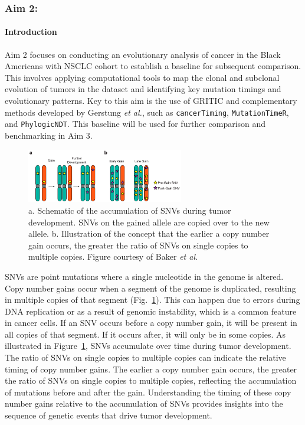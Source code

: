 \subsubsection{Aim 2: \SpecificAimTwo}

\paragraph{Introduction}

Aim 2 focuses on conducting an evolutionary analysis of cancer in the Black Americans with NSCLC cohort 
to establish a baseline for subsequent comparison. 
This involves applying computational tools to map the clonal and subclonal evolution of tumors in the dataset and 
identifying key mutation timings and evolutionary patterns.
Key to this aim is the use of GRITIC and complementary methods developed by Gerstung \textit{et al.}, 
such as \texttt{cancerTiming}, \texttt{MutationTimeR}, and \texttt{PhylogicNDT}.
This baseline will be used for further comparison and benchmarking in Aim 3.

\begin{figure} %
  \centering
  \begin{mdframed}
  \includegraphics[width=2.7in]{./Figures/SNVs_CN-gains.png}
  \caption{a. Schematic of the accumulation of SNVs during tumor development. 
  SNVs on the gained allele are copied over to the new allele. 
  b. Illustration of the concept that the earlier a copy number gain occurs, 
  the greater the ratio of SNVs on single copies to multiple copies.
  Figure courtesy of Baker \textit{et al.}}
  \label{SNVs_CN-gains}
  \end{mdframed}
\end{figure}

\vspace{1em}
\noindent
SNVs are point mutations where a single nucleotide in the genome is altered. 
Copy number gains occur when a segment of the genome is duplicated, resulting in multiple copies of that segment 
(Fig.~\ref{SNVs_CN-gains}). 
This can happen due to errors during DNA replication or as a result of genomic instability, 
which is a common feature in cancer cells. 
If an SNV occurs before a copy number gain, it will be present in all copies of that segment. 
If it occurs after, it will only be in some copies. 
As illustrated in Figure~\ref{SNVs_CN-gains}, SNVs accumulate over time during tumor development.
The ratio of SNVs on single copies to multiple copies can indicate the relative timing of copy number gains. 
The earlier a copy number gain occurs, the greater the ratio of SNVs on single copies to multiple copies, 
reflecting the accumulation of mutations before and after the gain.
Understanding the timing of these copy number gains relative to the accumulation of SNVs 
provides insights into the sequence of genetic events that drive tumor development.

